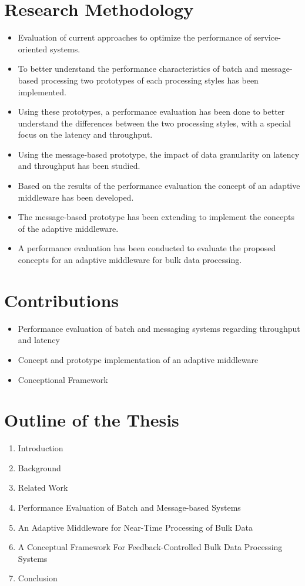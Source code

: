\section{Research Methodology}

\begin{itemize}
	\item Evaluation of current approaches to optimize the performance of service-oriented systems. 
	\item To better understand the performance characteristics of batch and message-based processing two prototypes of each processing styles has been implemented.
	\item Using these prototypes, a performance evaluation has been done to better understand the differences between the two processing styles, with a special focus on the latency and throughput.
	\item Using the message-based prototype, the impact of data granularity on latency and throughput has been studied.
	\item Based on the results of the performance evaluation the concept of an adaptive middleware has been developed.
	\item The message-based prototype has been extending to implement the concepts of the adaptive middleware.
	\item A performance evaluation has been conducted to evaluate the proposed concepts for an adaptive middleware for bulk data processing.
\end{itemize}

\section{Contributions}\label{sec:contributions}

\begin{itemize}
	\item Performance evaluation of batch and messaging systems regarding throughput and latency
	\item Concept and prototype implementation of an adaptive middleware 
	\item Conceptional Framework
\end{itemize}

\section{Outline of the Thesis}\label{sec:thesis_outline}

\begin{enumerate}
	\item Introduction
	\item Background
	\item Related Work
	\item Performance Evaluation of Batch and Message-based Systems
	\item An Adaptive Middleware for Near-Time Processing of Bulk Data
	\item A Conceptual Framework For Feedback-Controlled Bulk Data Processing Systems
	\item Conclusion
\end{enumerate}